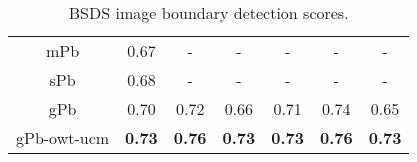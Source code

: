 \begin{table}[!ht]
{\begin{tabular}{c|c|c|c||c|c|c|}
\multicolumn{1}{|c|}{mPb \citep{Maire.Arbelaez.ea:CVPR:2008}}         & 0.67        & -          & -          & -           & -          & -          \\
\multicolumn{1}{|c|}{sPb \citep{Maire.Arbelaez.ea:CVPR:2008}}         & 0.68        & -          & -          & -           & -          & -          \\
\multicolumn{1}{|c|}{gPb \citep{Maire.Arbelaez.ea:CVPR:2008}}         & 0.70        & 0.72       & 0.66       & 0.71        & 0.74       & 0.65       \\
\multicolumn{1}{|c|}{gPb-owt-ucm \citep{Arbelaez.Maire.ea:PR:2009}} & \textbf{0.73}        & \textbf{0.76}       & \textbf{0.73}       & \textbf{0.73}        & \textbf{0.76}       & \textbf{0.73}       \\ \hline
\end{tabular}}
\caption{BSDS image boundary detection scores.}
\label{table:boundary_scores}
\end{table}


